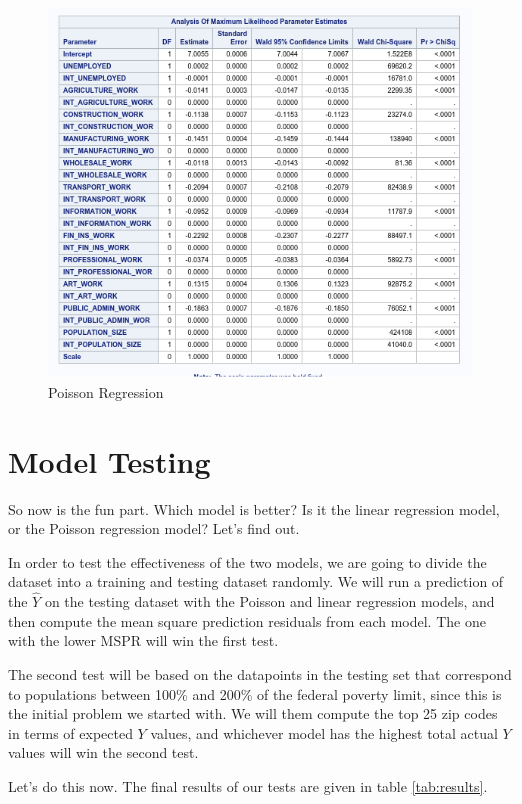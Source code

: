 \begin{figure}
\centering
\includegraphics{poisson.png}
\caption{Poisson Regression}
\label{fig:poisson}
\end{figure}


\section{Model Testing}

So now is the fun part. Which model is better? Is it the linear regression model, or the Poisson regression model? Let's find out.

In order to test the effectiveness of the two models, we are going to divide the dataset into a training and testing dataset randomly. We will run a prediction of the $\hat{Y}$ on the testing dataset with the Poisson and linear regression models, and then compute the mean square prediction residuals from each model. The one with the lower MSPR will win the first test.

The second test will be based on the datapoints in the testing set that correspond to populations between 100\% and 200\% of the federal poverty limit, since this is the initial problem we started with. We will them compute the top 25 zip codes in terms of expected $Y$ values, and whichever model has the highest total actual $Y$ values will win the second test.

Let's do this now. The final results of our tests are given in table \ref{tab:results}.


